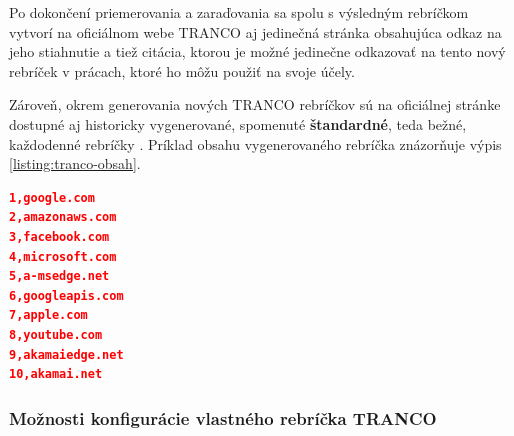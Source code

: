 Po dokončení priemerovania a zaraďovania sa spolu s výsledným rebríčkom vytvorí na oficiálnom webe TRANCO aj jedinečná stránka obsahujúca odkaz na jeho stiahnutie a tiež citácia, 
ktorou je možné jedinečne odkazovať na tento nový rebríček v prácach, ktoré ho môžu použiť na svoje účely.

Zároveň, okrem generovania nových TRANCO rebríčkov sú na oficiálnej stránke dostupné aj historicky vygenerované, spomenuté \textbf{štandardné}, teda bežné, každodenné rebríčky \cite{tranco-homepage}.
Príklad obsahu vygenerovaného rebríčka znázorňuje výpis \ref{listing:tranco-obsah}.



\pagebreak

\begin{center}
\centering
\begin{lstlisting}[caption={\centering Ukážka vygenerovaného denného rebríčku z 12. januára 2024, orezaného na prvých 10 domén. Rebríček je možné stiahnuť vo formáte \code{zip} archívu, ktorý obsahuje práve jeden súbor nazvaný \textbf{top-1m.csv}. Obsahom je na každom riadku pozícia domény a jej čiarkou oddelené meno.},
label=listing:tranco-obsah, 
language=json, 
frame=lb,
xleftmargin=.3875\textwidth, 
xrightmargin=.3875\textwidth]
1,google.com
2,amazonaws.com
3,facebook.com
4,microsoft.com
5,a-msedge.net
6,googleapis.com
7,apple.com
8,youtube.com
9,akamaiedge.net
10,akamai.net

\end{lstlisting}
\end{center}




\subsubsection{Možnosti konfigurácie vlastného rebríčka TRANCO}
\label{tranco-config}

